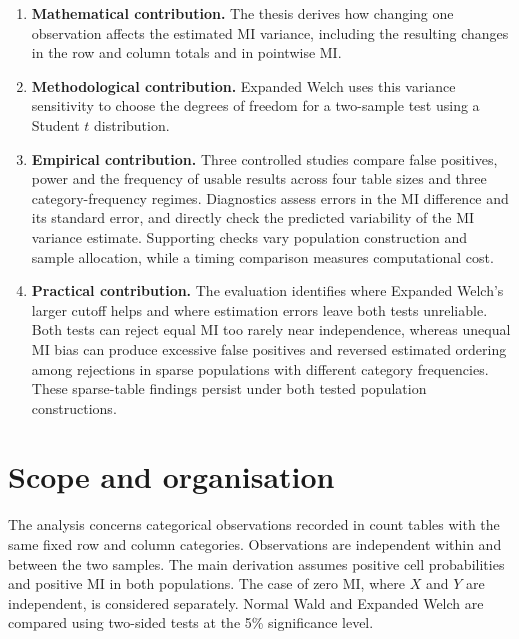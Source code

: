 \begin{enumerate}
  \item \begin{samepage}\textbf{Mathematical contribution.} The thesis derives how changing
  one observation affects the estimated MI variance, including the resulting
  changes in the row and column totals and in pointwise MI.
  \par
  \end{samepage}

  \item \begin{samepage}\textbf{Methodological contribution.} Expanded Welch uses this
  variance sensitivity to choose the degrees of freedom for a two-sample
  test using a Student \(t\) distribution.
  \par
  \end{samepage}

  \item \begin{samepage}\textbf{Empirical contribution.} Three controlled studies compare
  false positives, power and the frequency of usable results across
  four table sizes and three category-frequency regimes. Diagnostics
  assess errors in the MI difference and its standard error, and directly
  check the predicted variability of the MI variance estimate. Supporting
  checks vary population construction and sample allocation, while a
  timing comparison measures computational cost.
  \par
  \end{samepage}

  \item \textbf{Practical contribution.} The evaluation identifies
  where Expanded Welch's larger cutoff helps and where estimation errors
  leave both tests unreliable. Both tests can reject equal MI too rarely
  near independence, whereas unequal MI bias can produce excessive false
  positives and reversed estimated ordering among rejections in sparse
  populations with different category frequencies. These
  sparse-table findings persist under both tested population constructions.
\end{enumerate}

\section{Scope and organisation}

The analysis concerns categorical observations recorded in count tables
with the same fixed row and column categories. Observations are independent
within and between the two samples. The main derivation assumes positive
cell probabilities and positive MI in both populations. The case of zero MI,
where \(X\) and \(Y\) are independent, is considered separately.
Normal Wald and Expanded Welch are compared using two-sided tests at the
5\% significance level.

